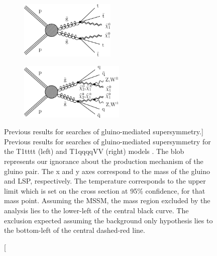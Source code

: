 \begin{figure}
\begin{subfigure}{0.45\textwidth}
\centering
\includegraphics[width=0.5\textwidth]{figs/CMS-SUS-16-033_Figure_001-a.pdf}  
\end{subfigure}
\begin{subfigure}{0.45\textwidth}
\centering
\includegraphics[width=0.55\textwidth]{figs/CMS-SUS-16-033_Figure_001-c.pdf}
\end{subfigure}
\caption
[Previous results for searches of gluino-mediated supersymmetry.]
{Previous results for searches of gluino-mediated supersymmetry for the T1tttt (left) and T1qqqqVV (right) models \cite{CMS-SUS-16-033}. The blob represents our ignorance about the production mechanism of the gluino pair. The x and y axes correspond to the mass of the gluino and LSP, respectively. The temperature corresponds to the upper limit which is set on the cross section at 95\% confidence, for that mass point. Assuming the MSSM, the mass region excluded by the analysis lies to the lower-left of the central black curve. The exclusion expected assuming the background only hypothesis lies to the bottom-left of the central dashed-red line.}
\label{fig:oldlimits}
\end{figure} 
